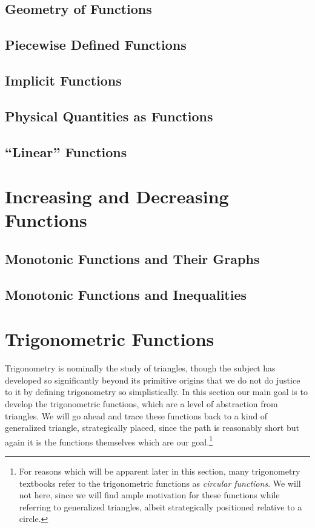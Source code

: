 \newpage


\subsection{Geometry of Functions}
\subsection{Piecewise Defined Functions}
\subsection{Implicit Functions}
\subsection{Physical Quantities as Functions}
\subsection{``Linear'' Functions}

\newpage
\section{Increasing and Decreasing Functions}
\subsection{Monotonic Functions and Their Graphs}
\subsection{Monotonic Functions and Inequalities}
\newpage
\section{Trigonometric Functions}

Trigonometry is nominally the study of triangles,
though the subject has developed so significantly beyond its
primitive origins that we do not do justice to it by
defining trigonometry so simplistically.  In this section our main goal
is to develop the trigonometric functions,
which are a level of abstraction from triangles.  
We will go 
ahead and trace these functions back to a kind of
generalized triangle, strategically placed, since the
path is reasonably short
but again it is the functions themselves which
are our goal.\footnote{
For reasons which will be apparent later in this section,
many trigonometry textbooks refer to the trigonometric
functions as {\it circular functions}.  We will not here,
since we will find ample motivation for these functions
while referring to generalized triangles, albeit 
strategically positioned relative to a circle.
}

